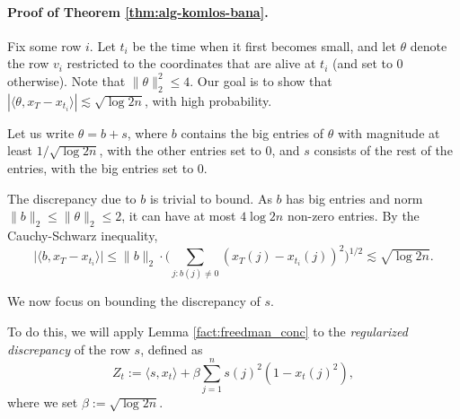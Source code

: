 \paragraph{Proof of Theorem \ref{thm:alg-komlos-bana}.}
%
%
Fix some row $i$. Let $t_i$ be the time when it first becomes small, and 
let $\theta$ denote the row $v_i$ restricted to the coordinates that are alive at $t_i$ (and set to $0$ otherwise). Note that $\|\theta\|^2_2 \leq 4$. 
Our goal is to show that
$|\langle \theta,x_T - x_{t_i} \rangle | \lesssim \sqrt{\log 2n}$, with high probability.

\smallskip
 
Let us write $\theta = b + s$, where $b$ contains the big entries of $\theta$ with magnitude at least $1/\sqrt{\log 2n}$, with the other entries set to $0$,
and $s$ consists of the rest of the entries, with the big entries set to $0$. 
\smallskip 

The discrepancy due to $b$ is trivial to bound. As $b$ has big entries and norm $\|b\|_2 \leq \|\theta\|_2 \le 2$, it can have at most $4 \log 2n$ non-zero entries. By the Cauchy-Schwarz inequality,
\[
\big|\langle b, x_T - x_{t_i} \rangle \big| \leq \|b\|_2 \cdot \Big(\sum_{j: b(j) \neq 0} (x_T(j) - x_{t_i}(j))^2\Big)^{1/2} \lesssim \sqrt{\log 2n}.
\]

\medskip
We now focus on bounding the discrepancy of $s$. 

To do this, we will apply Lemma \ref{fact:freedman_conc} to the {\em regularized discrepancy} of the row $s$, defined as
\[
Z_t := \langle s, x_t \rangle + \beta \sum_{j=1}^n s(j)^2 (1 - x_t(j)^2), 
\]
where we set $\beta :=\sqrt{\log 2n}$. 

